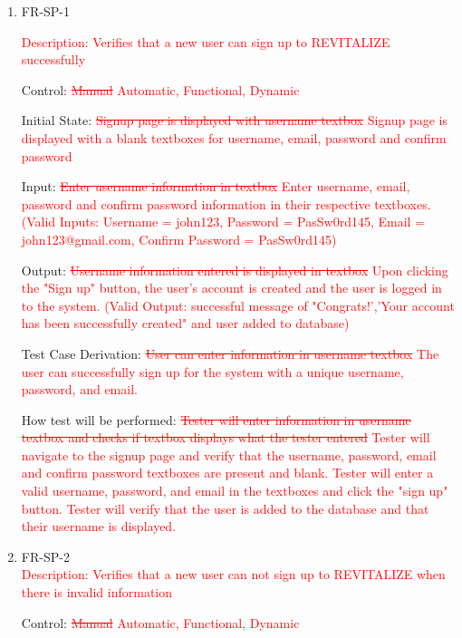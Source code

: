 \documentclass[12pt, titlepage]{article}
\begin{document}
\begin{enumerate}
	
	\item{FR-SP-1\\}

        \textcolor{red}{Description: Verifies that a new user can sign up to REVITALIZE successfully}
	
	Control: \textcolor{red}{\sout{Manual}} \textcolor{red}{Automatic, Functional,           Dynamic}
	
	Initial State: \textcolor{red}{\sout{Signup page is displayed with username textbox}} \textcolor{red}{Signup page is displayed with a blank textboxes for username, email, password and confirm password }
	
	Input: \textcolor{red}{\sout{Enter username information in textbox}} \textcolor{red}{Enter username, email, password and confirm password information in their respective textboxes. (Valid Inputs: Username = john123, Password = PasSw0rd145, Email = john123@gmail.com, Confirm Password = PasSw0rd145) }
	
	Output: \textcolor{red}{\sout{Username information entered is displayed in textbox} } \textcolor{red}{ Upon clicking the "Sign up" button, the user's account is created and the user is logged in to the system. (Valid Output: successful message of "Congrats!','Your account has been successfully created" and user added to database) }
	
	Test Case Derivation: \textcolor{red}{\sout{User can enter information in username textbox}} \textcolor{red}{The user can successfully sign up for the system with a unique username, password, and email.} 
	
	How test will be performed: \textcolor{red}{\sout{Tester will enter information in username textbox and checks if textbox displays what the tester entered}} \textcolor{red}{Tester will navigate to the signup page and verify that the username, password, email and confirm password textboxes are present and blank. Tester will enter a valid username, password, and email in the textboxes and click the "sign up" button. Tester will verify that the user is added to the database and that their username is displayed.}
	
	\item{FR-SP-2 \\}
        \textcolor{red}{Description: Verifies that a new user can not sign up to REVITALIZE when there is invalid information}
	
	Control: \textcolor{red}{\sout{Manual}} \textcolor{red}{Automatic, Functional,           Dynamic}


\end{enumerate}
\end{document}
